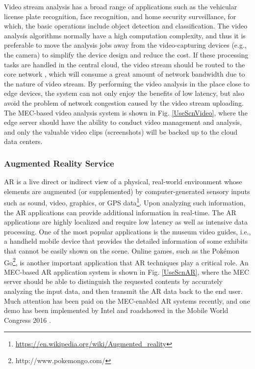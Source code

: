 \documentclass[journal]{IEEEtran}
\begin{document}
{Video stream analysis has a broad range of applications such as the vehicular license plate recognition, face recognition, and home security surveillance, for which, the basic operations include object detection and classification. The video analysis algorithms normally have a high computation complexity, and thus it is preferable to move the analysis jobs away from the video-capturing devices (e.g., the camera) to simplify the device design and reduce the cost. If these processing tasks are handled in the central cloud, the video stream should be routed to the core network \cite{AnjumTCC16}, which will consume a great amount of network bandwidth due to the nature of video stream. By performing the video analysis in the place close to edge devices, the system can not only enjoy the benefits of low latency, but also avoid the problem of network congestion caused by the video stream uploading. The MEC-based video analysis system is shown in Fig. \ref{UseScnVideo}, where the edge server should have the ability to conduct video management and analysis, and only the valuable video clips (screenshots) will be backed up to the cloud data centers.




\subsubsection{\textbf{Augmented Reality Service}}

AR is a live direct or indirect view of a physical, real-world environment whose elements are augmented (or supplemented) by computer-generated sensory inputs such as sound, video, graphics, or GPS data\footnote{\url{https://en.wikipedia.org/wiki/Augmented_reality}}. Upon analyzing such information, the AR applications can provide additional information in real-time. The AR applications are highly localized and require low latency as well as intensive data processing. One of the most popular applications is the museum video guides, i.e., a handheld mobile device that provides the detailed information of some exhibits that cannot be easily shown on the scene. Online games, such as the Pok\'emon Go\footnote{http://www.pokemongo.com/}, is another important application that AR techniques play a critical role. An MEC-based AR application system is shown in Fig. \ref{UseScnAR}, where the MEC server should be able to distinguish the requested contents by accurately analyzing the input data, and then transmit the AR data back to the end user. Much attention has been paid on the MEC-enabled AR systems recently, and one demo has been implemented by Intel and roadshowed in the Mobile World Congress 2016 \cite{IntelMECCongressAR}.


}
\end{document}
